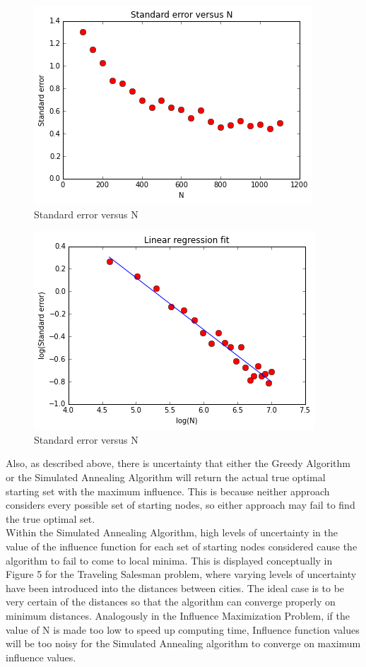 \documentclass[11pt]{scrartcl} %
\begin{document}
\begin{figure}
\centering
\includegraphics[width=10 cm]{StandardErrorVsN}
\caption{Standard error versus N}
\label{fig:StandardError}
\end{figure}

\begin{figure}
\centering
\includegraphics[width=10 cm]{LinearR}
\caption{Standard error versus N}
\label{fig:LR}
\end{figure}

Also, as described above, there is uncertainty that either the Greedy Algorithm or the Simulated Annealing Algorithm will return the actual true optimal starting set with the maximum influence.  This is because neither approach considers every possible set of starting nodes, so either approach may fail to find the true optimal set.  \\

Within the Simulated Annealing Algorithm, high levels of uncertainty in the value of the influence function for each set of starting nodes considered cause the algorithm to fail to come to local minima.  This is displayed conceptually in Figure 5 for the Traveling Salesman problem, where varying levels of uncertainty have been introduced into the distances between cities.  The ideal case is to be very certain of the distances so that the algorithm can converge properly on minimum distances.  Analogously in the Influence Maximization Problem, if the value of N is made too low to speed up computing time, Influence function values will be too noisy for the Simulated Annealing algorithm to converge on maximum influence values.  
	 
\end{document}
